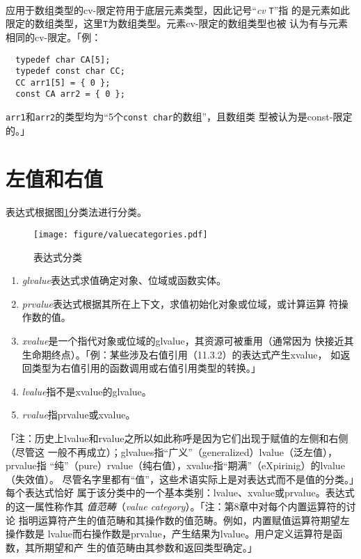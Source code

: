 \paragraph{}
应用于数组类型的cv-限定符用于底层元素类型，因此记号``\textit{cv} \texttt{T}''指
的是元素如此限定的数组类型，这里\texttt{T}为数组类型。元素cv-限定的数组类型也被
认为有与元素相同的cv-限定。「例：
\begin{lstlisting}
  typedef char CA[5];
  typedef const char CC;
  CC arr1[5] = { 0 };
  const CA arr2 = { 0 };
\end{lstlisting}
\texttt{arr1}和\texttt{arr2}的类型均为``5个\texttt{const char}的数组''，且数组类
型被认为是const-限定的。」

\section{左值和右值}
\paragraph{}
表达式根据图\ref{fig:valuecat}分类法进行分类。

\begin{figure}[htpb]
  \centering
  \texttt{[image: figure/valuecategories.pdf]}
  \caption{表达式分类}
  \label{fig:valuecat}
\end{figure}

\begin{enumerate}
  \item{\textit{glvalue}表达式求值确定对象、位域或函数实体。}
  \item{\textit{prvalue}表达式根据其所在上下文，求值初始化对象或位域，或计算运算
      符操作数的值。}
    \item{\textit{xvalue}是一个指代对象或位域的glvalue，其资源可被重用（通常因为
      快接近其生命期终点）。「例：某些涉及右值引用（11.3.2）的表达式产生xvalue，
      如返回类型为右值引用的函数调用或右值引用类型的转换。」}
    \item{\textit{lvalue}指不是xvalue的glvalue。}
    \item{\textit{rvalue}指prvalue或xvalue。}
\end{enumerate}
「注：历史上lvalue和rvalue之所以如此称呼是因为它们出现于赋值的左侧和右侧（尽管这
一般不再成立）；glvalues指``广义''（generalized）lvalue（泛左值），prvalue指
``纯''（pure）rvalue（纯右值），xvalue指``期满''（eXpirinig）的lvalue（失效值）。
尽管名字里都有``值''，这些术语实际上是对表达式而不是值的分类。」每个表达式恰好
属于该分类中的一个基本类别：lvalue、xvalue或prvalue。表达式的这一属性称作其
\textit{值范畴}（\textit{value category}）。「注：第8章中对每个内置运算符的讨论
指明运算符产生的值范畴和其操作数的值范畴。例如，内置赋值运算符期望左操作数是
lvalue而右操作数是prvalue，产生结果为lvalue。用户定义运算符是函数，其所期望和产
生的值范畴由其参数和返回类型确定。」


